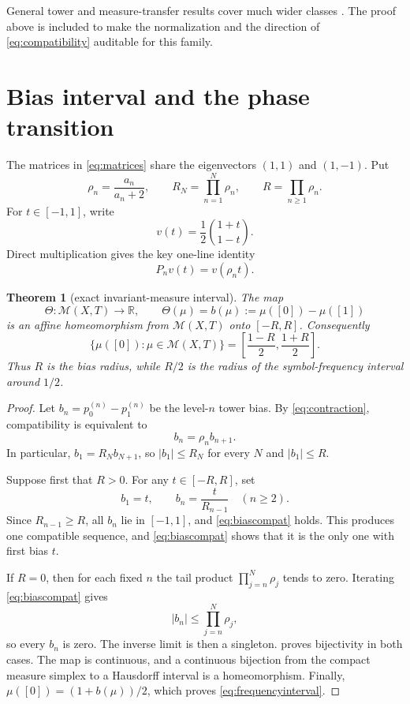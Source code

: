 \documentclass[11pt,a4paper]{amsart}
\newtheorem{theorem}{Theorem}[section]
\theoremstyle{definition}
\theoremstyle{remark}
\newcommand{\Mcal}{\mathcal M}
\begin{document}
General tower and measure-transfer results cover much wider classes
\cite{BedarideHilionLustig2021,BedarideHilionLustig2024}.  The proof above is included to make the
normalization and the direction of \eqref{eq:compatibility} auditable for
this family.

\section{Bias interval and the phase transition}

The matrices in \eqref{eq:matrices} share the eigenvectors $(1,1)$ and
$(1,-1)$.  Put
\begin{equation}\label{eq:rho}
 \rho_n=\frac{a_n}{a_n+2},
 \qquad
 R_N=\prod_{n=1}^{N}\rho_n,
 \qquad
 R=\prod_{n\geq1}\rho_n.
\end{equation}
For $t\in[-1,1]$, write
\[
 v(t)=\frac12\binom{1+t}{1-t}.
\]
Direct multiplication gives the key one-line identity
\begin{equation}\label{eq:contraction}
 P_nv(t)=v(\rho_nt).
\end{equation}

\begin{theorem}[exact invariant-measure interval]\label{thm:interval}
The map
\begin{equation}\label{eq:bias}
 \Theta:\Mcal(X,T)\longrightarrow\mathbb R,
 \qquad
 \Theta(\mu)=b(\mu):=\mu([0])-\mu([1])
\end{equation}
is an affine homeomorphism from $\Mcal(X,T)$ onto $[-R,R]$.
Consequently
\begin{equation}\label{eq:frequencyinterval}
 \{\mu([0]):\mu\in\Mcal(X,T)\}
 =\left[\frac{1-R}{2},\frac{1+R}{2}\right].
\end{equation}
Thus $R$ is the bias radius, while $R/2$ is the radius of the symbol-frequency
interval around $1/2$.
\end{theorem}

\begin{proof}
Let $b_n=p_0^{(n)}-p_1^{(n)}$ be the level-$n$ tower bias.  By
\eqref{eq:contraction}, compatibility is equivalent to
\begin{equation}\label{eq:biascompat}
 b_n=\rho_nb_{n+1}.
\end{equation}
In particular, $b_1=R_Nb_{N+1}$, so $|b_1|\leq R_N$ for every $N$ and
$|b_1|\leq R$.

Suppose first that $R>0$.  For any $t\in[-R,R]$, set
\[
 b_1=t,
 \qquad
 b_n=\frac{t}{R_{n-1}}\quad(n\geq2).
\]
Since $R_{n-1}\geq R$, all $b_n$ lie in $[-1,1]$, and
\eqref{eq:biascompat} holds.  This produces one compatible sequence, and
\eqref{eq:biascompat} shows that it is the only one with first bias $t$.

If $R=0$, then for each fixed $n$ the tail product
$\prod_{j=n}^{N}\rho_j$ tends to zero.  Iterating
\eqref{eq:biascompat} gives
\[
 |b_n|\leq\prod_{j=n}^{N}\rho_j,
\]
so every $b_n$ is zero.  The inverse limit is then a singleton.
 proves bijectivity in both cases.  The map is continuous,
and a continuous bijection from the compact measure simplex to a Hausdorff
interval is a homeomorphism.  Finally,
$\mu([0])=(1+b(\mu))/2$, which proves \eqref{eq:frequencyinterval}.
\end{proof}
\end{document}
